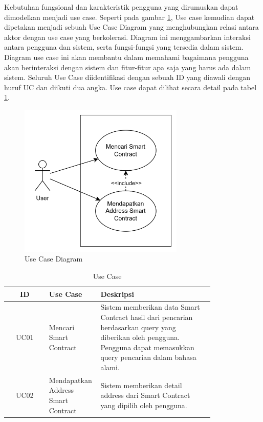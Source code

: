 Kebutuhan fungsional dan karakteristik pengguna yang dirumuskan dapat dimodelkan menjadi use case. Seperti pada gambar \ref{image:usecase}, Use case kemudian dapat dipetakan menjadi sebuah Use Case Diagram yang menghubungkan relasi antara aktor dengan use case yang berkolerasi. Diagram ini menggambarkan interaksi antara pengguna dan sistem, serta fungsi-fungsi yang tersedia dalam sistem. Diagram use case ini akan membantu dalam memahami bagaimana pengguna akan berinteraksi dengan sistem dan fitur-fitur apa saja yang harus ada dalam sistem. Seluruh Use Case diidentifikasi dengan sebuah ID yang diawali dengan huruf UC dan diikuti dua angka. Use case dapat dilihat secara detail pada tabel \ref{tabel:use-case}.

\begin{figure}[ht]
	\centering
	\includegraphics[width=0.7\textwidth]{resources/chapter-3/use-case.png}
	\caption{Use Case Diagram}
	\label{image:usecase}
\end{figure}

\begin{table}[h]
	\caption{Use Case}
	\label{tabel:use-case}
	\vspace{0.25cm}
	\begin{center}
		\begin{tabular}{|c|p{0.25\linewidth}|p{0.55\linewidth}|}
			\hline
			\textbf{ID} & \textbf{Use Case} & \textbf{Deskripsi} \\ \hline
			UC01 & Mencari Smart Contract & Sistem memberikan data Smart Contract hasil dari pencarian berdasarkan query yang diberikan oleh pengguna. Pengguna dapat memasukkan query pencarian dalam bahasa alami. \\ \hline
			UC02 & Mendapatkan Address Smart Contract & Sistem memberikan detail address dari Smart Contract yang dipilih oleh pengguna. \\ \hline
		\end{tabular}
	\end{center}
\end{table}



